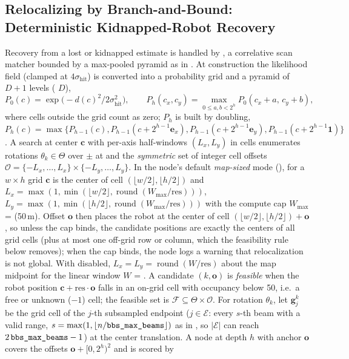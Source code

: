 \subsection{Relocalizing by Branch-and-Bound: Deterministic Kidnapped-Robot Recovery}\label{sec:bbs}

Recovery from a lost or kidnapped estimate is handled by , a correlative scan matcher \citep{olson2009correlative} bounded by a max-pooled pyramid as in \citet{hess2016realtime}. At construction the likelihood field (clamped at $4\sigma_{\mathrm{hit}}$) is converted into a probability grid and a pyramid of $D+1$ levels ( $D$),
\begin{equation}\label{eq:pyramid}
  P_0(c) = \exp\!\big(-d(c)^2/2\sigma_{\mathrm{hit}}^2\big),\qquad
  P_h(c_x,c_y) = \max_{0\le a,b<2^h} P_0(c_x+a,\,c_y+b),
\end{equation}
where cells outside the grid count as zero; $P_h$ is built by doubling, $P_h(c)=\max\{P_{h-1}(c),P_{h-1}(c+2^{h-1}\mathbf{e}_x),P_{h-1}(c+2^{h-1}\mathbf{e}_y),P_{h-1}(c+2^{h-1}\mathbf{1})\}$. A search at center $\mathbf{c}$ with per-axis half-windows $(L_x,L_y)$ in cells enumerates rotations $\theta_k\in\Theta$ over $\pm$ at  and the \emph{symmetric} set of integer cell offsets $\mathcal{O}=\{-L_x,\dots,L_x\}\times\{-L_y,\dots,L_y\}$. In the node's default \emph{map-sized} mode (), for a $w\times h$ grid $\mathbf{c}$ is the center of cell $(\lfloor w/2\rfloor,\lfloor h/2\rfloor)$ and $L_x=\max(1,\min(\lfloor w/2\rfloor,\operatorname{round}(W_{\max}/\mathrm{res})))$, $L_y=\max(1,\min(\lfloor h/2\rfloor,\operatorname{round}(W_{\max}/\mathrm{res})))$ with the compute cap $W_{\max}$ =  (50\,m). Offset $\mathbf{o}$ then places the robot at the center of cell $(\lfloor w/2\rfloor,\lfloor h/2\rfloor)+\mathbf{o}$, so unless the cap binds, the candidate positions are exactly the centers of all grid cells (plus at most one off-grid row or column, which the feasibility rule below removes); when the cap binds, the node logs a warning that relocalization is not global. With  disabled, $L_x=L_y=\operatorname{round}(W/\mathrm{res})$ about the map midpoint for the linear window $W$ = . A candidate $(k,\mathbf{o})$ is \emph{feasible} when the robot position $\mathbf{c}+\mathrm{res}\cdot\mathbf{o}$ falls in an on-grid cell with occupancy below 50, i.e.\ a free or unknown ($-1$) cell; the feasible set is $\mathcal{F}\subseteq\Theta\times\mathcal{O}$. For rotation $\theta_k$, let $\mathbf{g}_j^{k}$ be the grid cell of the $j$-th subsampled endpoint ($j\in\mathcal{E}$: every $s$-th beam with a valid range, $s=\max(1,\lfloor n/\texttt{bbs\_max\_beams}\rfloor)$ as in , so $|\mathcal{E}|$ can reach $2\,\texttt{bbs\_max\_beams}-1$) at the center translation. A node at depth $h$ with anchor $\mathbf{o}$ covers the offsets $\mathbf{o}+[0,2^h)^2$ and is scored by
